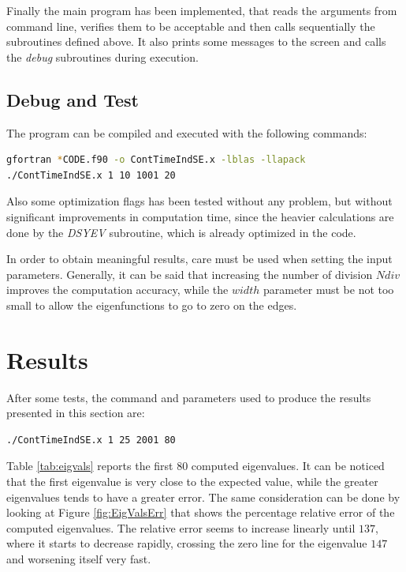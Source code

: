 \documentclass[11pt,a4paper]{article}
\begin{document}
%

Finally the main program has been implemented, that reads the arguments from command line, verifies them to be acceptable and then calls sequentially the subroutines defined above. It also prints some messages to the screen and calls the \textit{debug} subroutines during execution.

\subsection{Debug and Test}
The program can be compiled and executed with the following commands:
\begin{lstlisting}[language=BASH,numbers=none]
gfortran *CODE.f90 -o ContTimeIndSE.x -lblas -llapack  
./ContTimeIndSE.x 1 10 1001 20
\end{lstlisting}
Also some optimization flags has been tested without any problem, but without significant improvements in computation time, since the heavier calculations are done by the \textit{DSYEV} subroutine, which is already optimized in the code.

In order to obtain meaningful results, care must be used when setting the input parameters. 
Generally, it can be said that increasing the number of division $Ndiv$ improves the computation accuracy, while the $width$ parameter must be not too small to allow the eigenfunctions to go to zero on the edges. 

\section{Results} %
After some tests, the command and parameters used to produce the results presented in this section are:
\begin{lstlisting}[language=BASH,numbers=none]
./ContTimeIndSE.x 1 25 2001 80
\end{lstlisting}

Table \ref{tab:eigvals} reports the first 80 computed eigenvalues.
It can be noticed that the first eigenvalue is very close to the expected value, while the greater eigenvalues tends to have a greater error.
The same consideration can be done by looking at Figure \ref{fig:EigValsErr} that shows the percentage relative error of the computed eigenvalues. 
The relative error seems to increase linearly until $137$, where it starts to decrease rapidly, crossing the zero line for the eigenvalue $147$ and worsening itself very fast.
\end{document}
